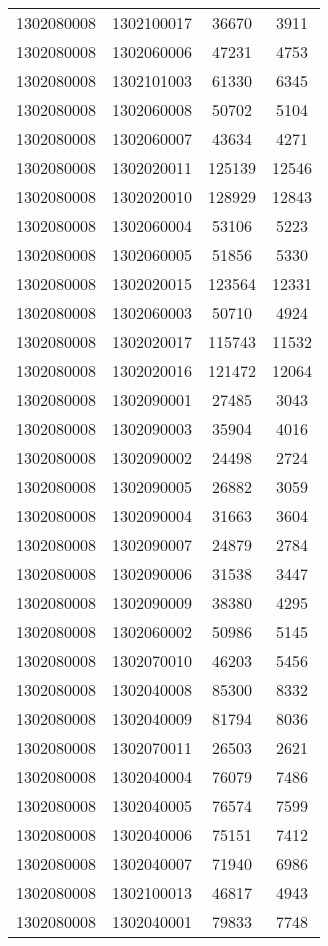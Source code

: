 \begin{longtable}[h]{llcc}
		1302080008 & 1302100017 & 36670 & 3911\\
		1302080008 & 1302060006 & 47231 & 4753\\
		1302080008 & 1302101003 & 61330 & 6345\\
		1302080008 & 1302060008 & 50702 & 5104\\
		1302080008 & 1302060007 & 43634 & 4271\\
		1302080008 & 1302020011 & 125139 & 12546\\
		1302080008 & 1302020010 & 128929 & 12843\\
		1302080008 & 1302060004 & 53106 & 5223\\
		1302080008 & 1302060005 & 51856 & 5330\\
		1302080008 & 1302020015 & 123564 & 12331\\
		1302080008 & 1302060003 & 50710 & 4924\\
		1302080008 & 1302020017 & 115743 & 11532\\
		1302080008 & 1302020016 & 121472 & 12064\\
		1302080008 & 1302090001 & 27485 & 3043\\
		1302080008 & 1302090003 & 35904 & 4016\\
		1302080008 & 1302090002 & 24498 & 2724\\
		1302080008 & 1302090005 & 26882 & 3059\\
		1302080008 & 1302090004 & 31663 & 3604\\
		1302080008 & 1302090007 & 24879 & 2784\\
		1302080008 & 1302090006 & 31538 & 3447\\
		1302080008 & 1302090009 & 38380 & 4295\\
		1302080008 & 1302060002 & 50986 & 5145\\
		1302080008 & 1302070010 & 46203 & 5456\\
		1302080008 & 1302040008 & 85300 & 8332\\
		1302080008 & 1302040009 & 81794 & 8036\\
		1302080008 & 1302070011 & 26503 & 2621\\
		1302080008 & 1302040004 & 76079 & 7486\\
		1302080008 & 1302040005 & 76574 & 7599\\
		1302080008 & 1302040006 & 75151 & 7412\\
		1302080008 & 1302040007 & 71940 & 6986\\
		1302080008 & 1302100013 & 46817 & 4943\\
		1302080008 & 1302040001 & 79833 & 7748\\

\end{longtable}
